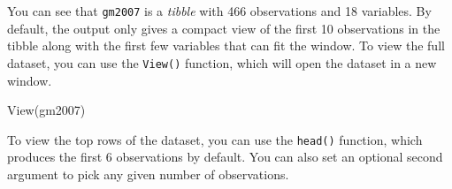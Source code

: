 \documentclass[
]{book}
\newenvironment{Shaded}{\begin{snugshade}}{\end{snugshade}}
\newcommand{\FunctionTok}[1]{\textcolor[rgb]{0.00,0.00,0.00}{#1}}
\newcommand{\NormalTok}[1]{#1}
\begin{document}
You can see that \texttt{gm2007} is a \emph{tibble} with 466 observations and 18 variables. By default, the output only gives a compact view of the first 10 observations in the tibble along with the first few variables that can fit the window. To view the full dataset, you can use the \texttt{View()} function, which will open the dataset in a new window.

\begin{Shaded}
\begin{Highlighting}[]
\FunctionTok{View}\NormalTok{(gm2007)}
\end{Highlighting}
\end{Shaded}

To view the top rows of the dataset, you can use the \texttt{head()} function, which produces the first 6 observations by default. You can also set an optional second argument to pick any given number of observations.
\end{document}
